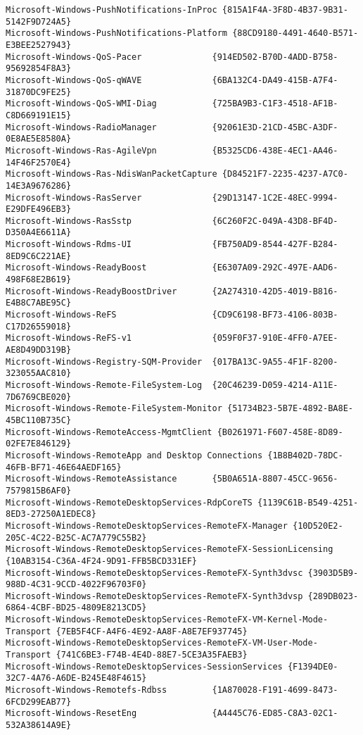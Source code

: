 \documentclass{report}
\begin{document}
\begin{lstlisting}[breaklines=true,basicstyle=\tiny]
Microsoft-Windows-PushNotifications-InProc {815A1F4A-3F8D-4B37-9B31-5142F9D724A5}
Microsoft-Windows-PushNotifications-Platform {88CD9180-4491-4640-B571-E3BEE2527943}
Microsoft-Windows-QoS-Pacer              {914ED502-B70D-4ADD-B758-95692854F8A3}
Microsoft-Windows-QoS-qWAVE              {6BA132C4-DA49-415B-A7F4-31870DC9FE25}
Microsoft-Windows-QoS-WMI-Diag           {725BA9B3-C1F3-4518-AF1B-C8D669191E15}
Microsoft-Windows-RadioManager           {92061E3D-21CD-45BC-A3DF-0E8AE5E8580A}
Microsoft-Windows-Ras-AgileVpn           {B5325CD6-438E-4EC1-AA46-14F46F2570E4}
Microsoft-Windows-Ras-NdisWanPacketCapture {D84521F7-2235-4237-A7C0-14E3A9676286}
Microsoft-Windows-RasServer              {29D13147-1C2E-48EC-9994-E29DFE496EB3}
Microsoft-Windows-RasSstp                {6C260F2C-049A-43D8-BF4D-D350A4E6611A}
Microsoft-Windows-Rdms-UI                {FB750AD9-8544-427F-B284-8ED9C6C221AE}
Microsoft-Windows-ReadyBoost             {E6307A09-292C-497E-AAD6-498F68E2B619}
Microsoft-Windows-ReadyBoostDriver       {2A274310-42D5-4019-B816-E4B8C7ABE95C}
Microsoft-Windows-ReFS                   {CD9C6198-BF73-4106-803B-C17D26559018}
Microsoft-Windows-ReFS-v1                {059F0F37-910E-4FF0-A7EE-AE8D49DD319B}
Microsoft-Windows-Registry-SQM-Provider  {017BA13C-9A55-4F1F-8200-323055AAC810}
Microsoft-Windows-Remote-FileSystem-Log  {20C46239-D059-4214-A11E-7D6769CBE020}
Microsoft-Windows-Remote-FileSystem-Monitor {51734B23-5B7E-4892-BA8E-45BC110B735C}
Microsoft-Windows-RemoteAccess-MgmtClient {B0261971-F607-458E-8D89-02FE7E846129}
Microsoft-Windows-RemoteApp and Desktop Connections {1B8B402D-78DC-46FB-BF71-46E64AEDF165}
Microsoft-Windows-RemoteAssistance       {5B0A651A-8807-45CC-9656-7579815B6AF0}
Microsoft-Windows-RemoteDesktopServices-RdpCoreTS {1139C61B-B549-4251-8ED3-27250A1EDEC8}
Microsoft-Windows-RemoteDesktopServices-RemoteFX-Manager {10D520E2-205C-4C22-B25C-AC7A779C55B2}
Microsoft-Windows-RemoteDesktopServices-RemoteFX-SessionLicensing {10AB3154-C36A-4F24-9D91-FFB5BCD331EF}
Microsoft-Windows-RemoteDesktopServices-RemoteFX-Synth3dvsc {3903D5B9-988D-4C31-9CCD-4022F96703F0}
Microsoft-Windows-RemoteDesktopServices-RemoteFX-Synth3dvsp {289DB023-6864-4CBF-BD25-4809E8213CD5}
Microsoft-Windows-RemoteDesktopServices-RemoteFX-VM-Kernel-Mode-Transport {7EB5F4CF-A4F6-4E92-AA8F-A8E7EF937745}
Microsoft-Windows-RemoteDesktopServices-RemoteFX-VM-User-Mode-Transport {741C6BE3-F74B-4E4D-88E7-5CE3A35FAEB3}
Microsoft-Windows-RemoteDesktopServices-SessionServices {F1394DE0-32C7-4A76-A6DE-B245E48F4615}
Microsoft-Windows-Remotefs-Rdbss         {1A870028-F191-4699-8473-6FCD299EAB77}
Microsoft-Windows-ResetEng               {A4445C76-ED85-C8A3-02C1-532A38614A9E}

\end{lstlisting}
\end{document}
